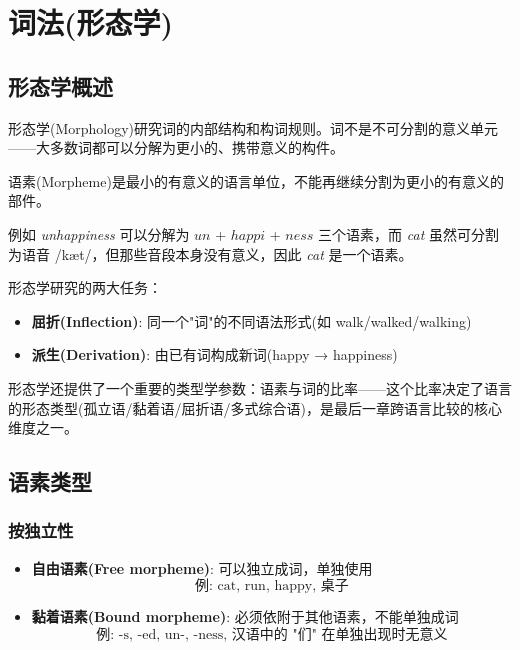 \clearpage
\vspace*{\fill}
\section{词法(形态学)}
\vspace*{\fill}
\clearpage


\subsection{形态学概述}

形态学(Morphology)研究词的内部结构和构词规则。词不是不可分割的意义单元——大多数词都可以分解为更小的、携带意义的构件。

\begin{definition}[语素]
语素(Morpheme)是最小的有意义的语言单位，不能再继续分割为更小的有意义的部件。
\end{definition}

例如 \emph{unhappiness} 可以分解为 $un$ + $happi$ + $ness$ 三个语素，而 \emph{cat} 虽然可分割为语音 /kæt/，但那些音段本身没有意义，因此 \emph{cat} 是一个语素。

形态学研究的两大任务：
\begin{itemize}
    \item \textbf{屈折(Inflection)}: 同一个"词"的不同语法形式(如 walk/walked/walking)
    \item \textbf{派生(Derivation)}: 由已有词构成新词(happy → happiness)
\end{itemize}

形态学还提供了一个重要的类型学参数：语素与词的比率——这个比率决定了语言的形态类型(孤立语/黏着语/屈折语/多式综合语)，是最后一章跨语言比较的核心维度之一。

\subsection{语素类型}

\subsubsection{按独立性}

\begin{itemize}
    \item \textbf{自由语素(Free morpheme)}: 可以独立成词，单独使用
    \begin{equation}
        \text{例: cat, run, happy, 桌子}
    \end{equation}
    
    \item \textbf{黏着语素(Bound morpheme)}: 必须依附于其他语素，不能单独成词
    \begin{equation}
        \text{例: -s, -ed, un-, -ness, 汉语中的 "们" 在单独出现时无意义}
    \end{equation}
\end{itemize}

